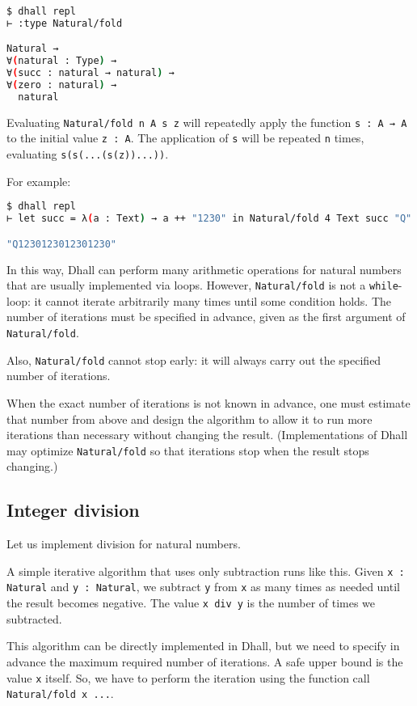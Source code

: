\begin{lstlisting}[language=Bash]
$ dhall repl
⊢ :type Natural/fold

Natural →
∀(natural : Type) →
∀(succ : natural → natural) →
∀(zero : natural) →
  natural
\end{lstlisting}


Evaluating \lstinline!Natural/fold n A s z! will repeatedly apply the function \lstinline!s : A → A! to the initial value \lstinline!z : A!.
The application of \lstinline!s! will be repeated \lstinline!n! times, evaluating \lstinline!s(s(...(s(z))...))!.


For example:
\begin{lstlisting}[language=Bash]
$ dhall repl
⊢ let succ = λ(a : Text) → a ++ "1230" in Natural/fold 4 Text succ "Q" 

"Q1230123012301230"
\end{lstlisting}


In this way, Dhall can perform many arithmetic operations for natural numbers that are usually implemented via loops.
However, \lstinline!Natural/fold! is not a \lstinline!while!-loop: it cannot iterate arbitrarily many times until some condition holds.
The number of iterations must be specified in advance, given as the first argument of \lstinline!Natural/fold!.


Also, \lstinline!Natural/fold! cannot stop early: it will always carry out the specified number of iterations.


When the exact number of iterations is not known in advance, one must estimate that number from above and design the algorithm to allow it to run more iterations than necessary without changing the result.
(Implementations of Dhall may optimize \lstinline!Natural/fold! so that iterations stop when the result stops changing.)


\subsection{Integer division}


Let us implement division for natural numbers.


A simple iterative algorithm that uses only subtraction runs like this.
Given \lstinline!x : Natural! and \lstinline!y : Natural!, we subtract \lstinline!y! from \lstinline!x! as many times as needed until the result becomes negative.
The value \lstinline!x div y! is the number of times we subtracted.


This algorithm can be directly implemented in Dhall, but we need to specify in advance the maximum required number of iterations.
A safe upper bound is the value \lstinline!x! itself.
So, we have to perform the iteration using the function call \lstinline!Natural/fold x ...!.


